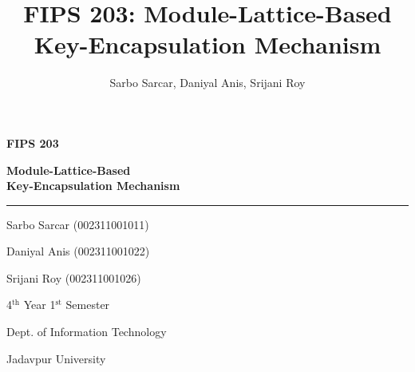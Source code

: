 \documentclass[aspectratio=169,11pt]{beamer}
\title[FIPS 203: ML-KEM]{FIPS 203: Module-Lattice-Based Key-Encapsulation Mechanism}
\author{Sarbo Sarcar, Daniyal Anis, Srijani Roy}
\institute{Department of Information Technology, Jadavpur University}
\date{}
\begin{document}

\begin{frame}[plain]

    \vspace*{1.25cm}
    \hspace*{1.05cm}
    \begin{minipage}{0.78\textwidth}

        {\fontsize{20}{34}\selectfont
        \bfseries\color{Navy} FIPS 203\par}

        \vspace{0.18cm}

        {\fontsize{14}{21}\selectfont
        \bfseries\color{Navy}
        Module-Lattice-Based\\[-1pt]
        Key-Encapsulation Mechanism\par}

        \vspace{0.22cm}

        {\color{Teal}\rule{2.2cm}{1.3pt}\par}

        \vspace{0.48cm}

        {\small
        Sarbo Sarcar (002311001011)\par
        \vspace{0.07cm}
        Daniyal Anis (002311001022)\par
        \vspace{0.07cm}
        Srijani Roy (002311001026)\par
        }

        \vspace{0.06cm}

        {\small
        4$^\text{th}$ Year 1$^\text{st}$ Semester\par
        Dept. of Information Technology\par
        Jadavpur University\par
        }

    \end{minipage}

    \vfill

\end{frame}
\end{document}
